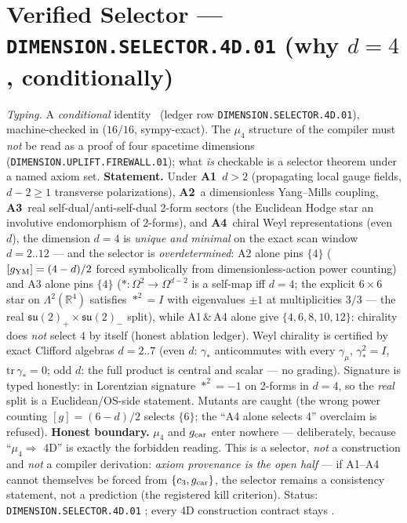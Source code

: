 \documentclass[11pt,a4paper]{article}
\begin{document}
\section*{Verified Selector --- \texttt{DIMENSION.SELECTOR.4D.01} (why $d=4$, conditionally)}
\noindent\emph{Typing.} A \emph{conditional} identity \mC\ (ledger row
\texttt{DIMENSION.SELECTOR.4D.01}), machine-checked in
 ($16/16$, sympy-exact).  The $\mu_4$ structure of the
compiler must \emph{not} be read as a proof of four spacetime dimensions
(\texttt{DIMENSION.UPLIFT.FIREWALL.01}); what \emph{is} checkable is a selector theorem under a
named axiom set.  \textbf{Statement.}  Under
\textbf{A1}~$d>2$ (propagating local gauge fields, $d-2\ge1$ transverse polarizations),
\textbf{A2}~a dimensionless Yang--Mills coupling,
\textbf{A3}~real self-dual/anti-self-dual 2-form sectors (the Euclidean Hodge star an involutive
endomorphism of 2-forms), and
\textbf{A4}~chiral Weyl representations (even $d$),
the dimension $d=4$ is \emph{unique and minimal} on the exact scan window $d=2..12$ --- and the
selector is \emph{overdetermined}: A2 alone pins $\{4\}$ ($[g_{\rm YM}]=(4-d)/2$ forced
symbolically from dimensionless-action power counting) and A3 alone pins $\{4\}$
($*:\Omega^2\to\Omega^{d-2}$ is a self-map iff $d=4$; the explicit $6\times6$ star on
$\Lambda^2(\mathbb R^4)$ satisfies $*^2=I$ with eigenvalues $\pm1$ at multiplicities $3/3$ ---
the real $\mathfrak{su}(2)_+\times\mathfrak{su}(2)_-$ split), while A1\,\&\,A4 alone give
$\{4,6,8,10,12\}$: chirality does \emph{not} select $4$ by itself (honest ablation ledger).
Weyl chirality is certified by exact Clifford algebras $d=2..7$ (even $d$: $\gamma_*$
anticommutes with every $\gamma_\mu$, $\gamma_*^2=I$, $\mathrm{tr}\,\gamma_*=0$; odd $d$: the
full product is central and scalar --- no grading).  Signature is typed honestly: in Lorentzian
signature $*^2=-1$ on 2-forms in $d=4$, so the \emph{real} split is a Euclidean/OS-side
statement.  Mutants are caught (the wrong power counting $[g]=(6-d)/2$ selects $\{6\}$; the
``A4 alone selects 4'' overclaim is refused).  \textbf{Honest boundary.}  $\mu_4$ and
$g_{\rm car}$ enter nowhere --- deliberately, because ``$\mu_4\Rightarrow$ 4D'' is exactly the
forbidden reading.  This is a selector, \emph{not} a construction and \emph{not} a compiler
derivation: \emph{axiom provenance is the open half} --- if A1--A4 cannot themselves be forced
from $\{c_3, g_{\rm car}\}$, the selector remains a consistency statement, not a prediction
(the registered kill criterion).  Status: \texttt{DIMENSION.SELECTOR.4D.01} \mC; every 4D
construction contract stays \mO.
\end{document}
